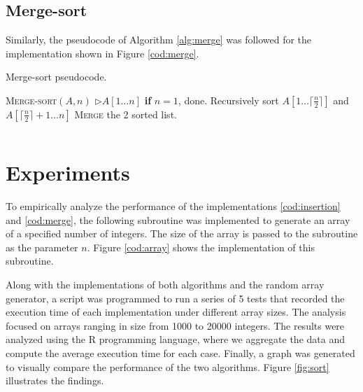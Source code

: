 \documentclass[11pt]{article}
\begin{document}
\inputminted[linenos]{python}{insertion_sort.py}
\label{cod:insertion}

\subsection{Merge-sort}
Similarly, the pseudocode of Algorithm \ref{alg:merge} was followed for the implementation shown in Figure \ref{cod:merge}.

\begin{algorithm}
    \caption{Merge-sort pseudocode.}
    \begin{algorithmic}[1]
        \STATE \textsc{Merge-sort}$(A, n)$ \hspace{5mm} $\rhd A[1 \ldots n]$
        \STATE \hspace{1em} \textbf{if} $n = 1$, done.
        \STATE \hspace{1em} Recursively sort $A[ 1 \ldots \lceil \frac{n}{2} \rceil ]$ and $A[ \lceil \frac{n}{2} \rceil + 1 \ldots n ]$
        \STATE \hspace{1em} \textsc{Merge} the 2 sorted list.
    \end{algorithmic}
    \label{alg:merge}
\end{algorithm}

\inputminted[linenos]{python}{merge_sort.py}
\label{cod:merge}

\section{Experiments}
To empirically analyze the performance of the implementations \ref{cod:insertion} and \ref{cod:merge}, the following subroutine was implemented to generate an array of a specified number of integers. The size of the array is passed to the subroutine as the parameter $n$. Figure \ref{cod:array} shows the implementation of this subroutine.

Along with the implementations of both algorithms and the random array generator, a script was programmed to run a series of 5 tests that recorded the execution time of each implementation under different array sizes. The analysis focused on arrays ranging in size from 1000 to 20000 integers. The results were analyzed using the R programming language, where we aggregate the data and compute the average execution time for each case.  Finally, a graph was generated to visually compare the performance of the two algorithms. Figure \ref{fig:sort} illustrates the findings.
\end{document}
